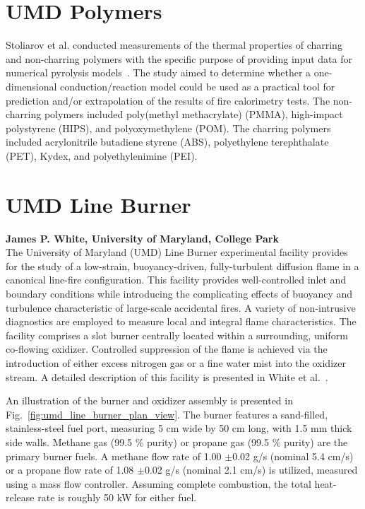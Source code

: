 \section{UMD Polymers}
\label{UMD_Polymers_Description}

Stoliarov et al. conducted measurements of the thermal properties of charring and non-charring polymers with the specific purpose of providing input data for numerical pyrolysis models~\cite{Li:IJHMT,Li:CF,Li:PDS_2014,Li:PDS_2015}. The study aimed to determine whether a one-dimensional conduction/reaction model could be used as a practical tool for prediction and/or extrapolation of the results of fire calorimetry tests. The non-charring polymers included poly(methyl methacrylate) (PMMA), high-impact polystyrene (HIPS), and polyoxymethylene (POM). The charring polymers included acrylonitrile butadiene styrene (ABS), polyethylene terephthalate (PET), Kydex, and polyethylenimine (PEI).


\section{UMD Line Burner}
\label{UMD_Line_Burner_Description}

{\bf James P. White, University of Maryland, College Park}\\

\noindent The University of Maryland (UMD) Line Burner experimental facility provides for the study of a low-strain, buoyancy-driven, fully-turbulent diffusion flame in a canonical line-fire configuration. This facility provides well-controlled inlet and boundary conditions while introducing the complicating effects of buoyancy and turbulence characteristic of large-scale accidental fires. A variety of non-intrusive diagnostics are employed to measure local and integral flame characteristics. The facility comprises a slot burner centrally located within a surrounding, uniform co-flowing oxidizer. Controlled suppression of the flame is achieved via the introduction of either excess nitrogen gas or a fine water mist into the oxidizer stream. A detailed description of this facility is presented in White et al.~\cite{White:2015}.

An illustration of the burner and oxidizer assembly is presented in Fig.~\ref{fig:umd_line_burner_plan_view}.  The burner features a sand-filled, stainless-steel fuel port, measuring 5 cm wide by 50 cm long, with 1.5 mm thick side walls. Methane gas (99.5 \% purity) or propane gas (99.5 \% purity) are the primary burner fuels. A methane flow rate of 1.00 $\pm$0.02 g/s (nominal 5.4 cm/s) or a propane flow rate of 1.08 $\pm$0.02 g/s (nominal 2.1 cm/s) is utilized, measured using a mass flow controller. Assuming complete combustion, the total heat-release rate is roughly 50 kW for either fuel.

